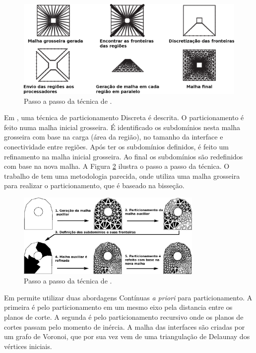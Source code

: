  
 \begin{figure}[htbp]
     \centering
     \includegraphics[width=1.0\textwidth]{fig/gaither.png}
     \caption{Passo a passo da técnica de \cite{bib:GAITHER96}.}
     \label{fig:gaither}
 \end{figure} 

 
 Em \cite{bib:WU96}, uma técnica de particionamento Discreta é descrita. O particionamento é feito numa malha inicial grosseira. É identificado os subdomínios nesta malha grosseira com base na carga (área da região), no tamanho da interface e conectividade entre regiões. Após ter os subdomínios definidos, é feito um refinamento na malha inicial grosseira. Ao final os subdomínios são redefinidos com base na nova malha. A Figura \ref{fig:wu} ilustra o passo a passo da técnica. O trabalho de \cite{bib:BANK05} tem uma metodologia parecida, onde utiliza uma malha grosseira para realizar o particionamento, que é baseado na bisseção. 
 
 \begin{figure}[htbp]
     \centering
     \includegraphics[width=0.8\textwidth]{fig/wu.png}
     \caption{Passo a passo da técnica de \cite{bib:WU96}.}
     \label{fig:wu}
 \end{figure}  

 
Em \cite{bib:GALTIER96} permite utilizar duas abordagens Contínuas \textit{a priori} para particionamento. A primeira é pelo particionamento em um mesmo eixo pela distancia entre os planos de corte. A segunda é pelo particionamento recursivo onde os planos de cortes passam pelo momento de inércia. A malha das interfaces são criadas por um grafo de Voronoi, que por sua vez vem de uma triangulação de Delaunay dos vértices iniciais.
 

